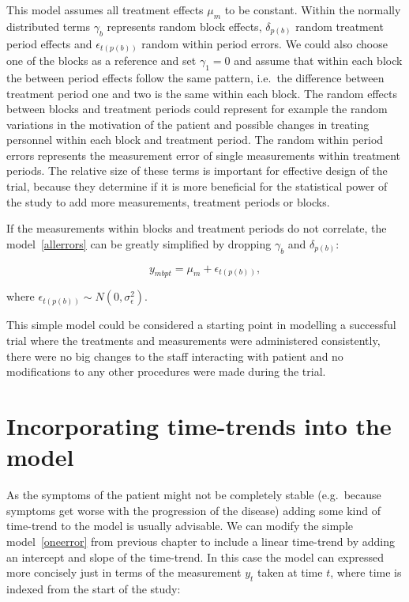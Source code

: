 \documentclass[12pt,a4paper,leqno]{report}
\theoremstyle{plain}
\theoremstyle{definition}
\theoremstyle{remark}
\begin{document}
This model assumes all treatment effects \(\mu_m\) to be constant. Within the
normally distributed terms \(\gamma_b\) represents random block effects,
\(\delta_{p(b)}\) random treatment period effects and \(\epsilon_{t(p(b))}\) random within
period errors. We could also choose one of the blocks as a reference and set
\(\gamma_1 = 0\) and assume that within each block the between period effects
follow the same pattern, i.e.\ the difference between treatment period one and
two is the same within each block. The random effects between blocks and treatment
periods could represent for example the random variations in the motivation of the patient and possible
changes in treating personnel within each block and treatment period. The random
within period errors represents the measurement error of single measurements
within treatment periods. The relative size of these terms is important
for effective design of the trial, because they determine if it is more
beneficial for the statistical power of the study to add more measurements,
treatment periods or blocks.

If the measurements within blocks and treatment periods do not correlate, the
model\ \ref{allerrors} can be greatly simplified by dropping \(\gamma_b\) and
\(\delta_{p(b)}\):

\begin{def}\label{}
    \begin{equation}\label{oneerror}
        y_{mbpt} = \mu_m + \epsilon_{t(p(b))},
    \end{equation}
\end{def}where \(\epsilon_{t(p(b))} \sim N(0,\sigma^2_{\epsilon})\).

This simple model could be considered a starting point in modelling a successful trial where
the treatments and measurements were administered consistently, there were no big changes to the staff interacting
with patient and no modifications to any other procedures were made during
the trial.

\section{Incorporating time-trends into the model}\label{timetrends}

As the symptoms of the patient might not be completely stable (e.g.\ because
symptoms get worse with the progression of the disease) adding some kind of
time-trend to the model is usually advisable. We can modify the simple model\ \ref{oneerror} from previous chapter to include a linear time-trend by adding an
intercept and slope of the time-trend. In this case the model can expressed more
concisely just in terms of the measurement \(y_t\) taken at time \(t\), where
time is indexed from the start of the study:
\end{document}
